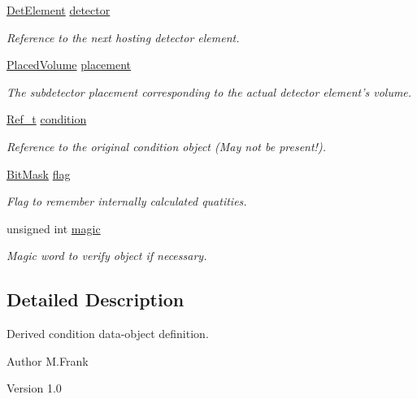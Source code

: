 \begin{DoxyCompactItemize}
\hyperlink{namespace_d_d4hep_a21dd977310ff183f61ca6ae14b59a989}{DetElement} \hyperlink{class_d_d4hep_1_1_alignments_1_1_alignment_data_abf7096d1f2d3ed307c361f2d6d03710e}{detector}
\begin{DoxyCompactList}\small\item\em Reference to the next hosting detector element. \item\end{DoxyCompactList}\item 
\hyperlink{class_d_d4hep_1_1_geometry_1_1_placed_volume}{PlacedVolume} \hyperlink{class_d_d4hep_1_1_alignments_1_1_alignment_data_a0da8f92652a64d0ca69a1c884bd5b034}{placement}
\begin{DoxyCompactList}\small\item\em The subdetector placement corresponding to the actual detector element's volume. \item\end{DoxyCompactList}\item 
\hyperlink{class_d_d4hep_1_1_handle}{Ref\_\-t} \hyperlink{class_d_d4hep_1_1_alignments_1_1_alignment_data_aab00f6e7c9ac1f261f68440ade585cbb}{condition}
\begin{DoxyCompactList}\small\item\em Reference to the original condition object (May not be present!). \item\end{DoxyCompactList}\item 
\hyperlink{class_d_d4hep_1_1_alignments_1_1_alignment_data_ab5c31f7e5512ca675be8323bc723b123}{BitMask} \hyperlink{class_d_d4hep_1_1_alignments_1_1_alignment_data_a49383dd1e10e850bfeb455440439dec2}{flag}
\begin{DoxyCompactList}\small\item\em Flag to remember internally calculated quatities. \item\end{DoxyCompactList}\item 
unsigned int \hyperlink{class_d_d4hep_1_1_alignments_1_1_alignment_data_a52652c8211546dca391a248a6f4c422a}{magic}
\begin{DoxyCompactList}\small\item\em Magic word to verify object if necessary. \item\end{DoxyCompactList}\end{DoxyCompactItemize}


\subsection{Detailed Description}
Derived condition data-\/object definition. \begin{DoxyAuthor}{Author}
M.Frank 
\end{DoxyAuthor}
\begin{DoxyVersion}{Version}
1.0 
\end{DoxyVersion}


